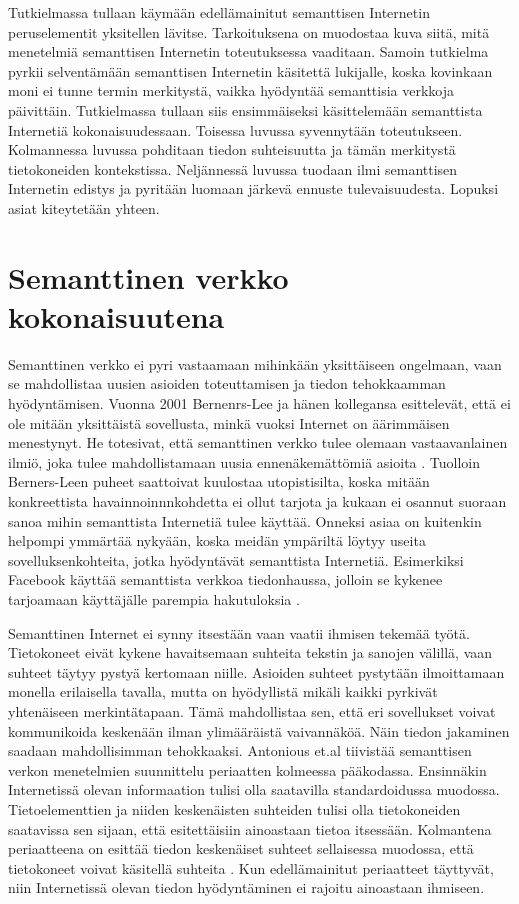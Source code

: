 \documentclass[finnish, 12pt, a4paper, elec, utf8, pdfa, online]{aaltothesis}
\begin{document}
Tutkielmassa tullaan käymään edellämainitut semanttisen Internetin peruselementit yksitellen lävitse. Tarkoituksena on muodostaa kuva siitä, mitä menetelmiä semanttisen Internetin toteutuksessa vaaditaan. Samoin tutkielma pyrkii selventämään semanttisen Internetin käsitettä lukijalle, koska kovinkaan moni ei tunne termin merkitystä, vaikka hyödyntää semanttisia verkkoja päivittäin. Tutkielmassa tullaan siis ensimmäiseksi käsittelemään semanttista Internetiä kokonaisuudessaan. Toisessa luvussa syvennytään toteutukseen. Kolmannessa luvussa pohditaan tiedon suhteisuutta ja tämän merkitystä tietokoneiden kontekstissa. Neljännessä luvussa tuodaan ilmi semanttisen Internetin edistys ja pyritään luomaan järkevä ennuste tulevaisuudesta. Lopuksi asiat kiteytetään yhteen.


\clearpage %
\section{Semanttinen verkko kokonaisuutena}


Semanttinen verkko ei pyri vastaamaan mihinkään yksittäiseen ongelmaan, vaan se mahdollistaa uusien asioiden toteuttamisen ja tiedon tehokkaamman hyödyntämisen.
Vuonna 2001 Bernenrs-Lee ja hänen kollegansa esittelevät, että ei ole mitään yksittäistä sovellusta, minkä vuoksi Internet on äärimmäisen menestynyt. He totesivat, että semanttinen verkko tulee olemaan vastaavanlainen ilmiö, joka tulee mahdollistamaan uusia ennenäkemättömiä asioita \cite{Berners_visio}. Tuolloin Berners-Leen puheet saattoivat kuulostaa utopistisilta, koska mitään konkreettista havainnoinnnkohdetta ei ollut tarjota ja kukaan ei osannut suoraan sanoa mihin semanttista Internetiä tulee käyttää. Onneksi asiaa on kuitenkin helpompi ymmärtää nykyään, koska meidän ympäriltä löytyy useita sovelluksenkohteita, jotka hyödyntävät semanttista Internetiä. Esimerkiksi Facebook käyttää semanttista verkkoa tiedonhaussa, jolloin se kykenee tarjoamaan käyttäjälle parempia hakutuloksia \cite{Facebook}.


Semanttinen Internet ei synny itsestään vaan vaatii ihmisen tekemää työtä. Tietokoneet eivät kykene havaitsemaan suhteita tekstin ja sanojen välillä, vaan suhteet täytyy pystyä kertomaan niille. Asioiden suhteet pystytään ilmoittamaan monella erilaisella tavalla, mutta on hyödyllistä mikäli kaikki pyrkivät yhtenäiseen merkintätapaan. Tämä mahdollistaa sen, että eri sovellukset voivat kommunikoida keskenään ilman ylimääräistä vaivannäköä. Näin tiedon jakaminen saadaan mahdollisimman tehokkaaksi. Antonious et.al tiivistää semanttisen verkon menetelmien suunnittelu periaatten kolmeessa pääkodassa. Ensinnäkin Internetissä olevan informaation tulisi olla saatavilla standardoidussa muodossa. Tietoelementtien ja niiden keskenäisten suhteiden tulisi olla tietokoneiden saatavissa sen sijaan, että esitettäisiin ainoastaan tietoa itsessään. Kolmantena periaatteena on esittää tiedon keskenäiset suhteet sellaisessa muodossa, että tietokoneet voivat käsitellä suhteita \cite{Antoniou}. Kun edellämainitut periaatteet täyttyvät, niin Internetissä olevan tiedon hyödyntäminen ei rajoitu ainoastaan ihmiseen.
\end{document}
